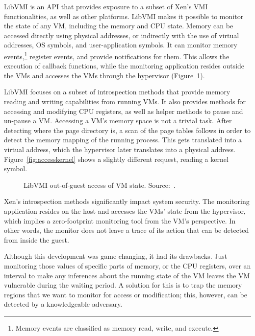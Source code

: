 \par LibVMI is an \ac{API} that provides exposure to a subset of Xen’s \ac{VMI} functionalities, as well as other platforms. LibVMI makes it possible to monitor the state of any \ac{VM}, including the memory and \ac{CPU} state. Memory can be accessed directly using physical addresses, or indirectly with the use of virtual addresses, \ac{OS} symbols, and user-application symbols. It can monitor memory events,\footnote{Memory events are classified as memory read, write, and execute.} register events, and provide notifications for them. This allows the execution of callback functions, while the monitoring application resides outside the \acp{VM} and accesses the \acp{VM} through the hypervisor (Figure~\ref{fig:libvmi}). 

\par LibVMI focuses on a subset of introspection methods that provide memory reading and writing capabilities from running \ac{VM}s. It also provides methods for accessing and modifying \ac{CPU} registers, as well as helper methods to pause and un-pause a \ac{VM}. Accessing a \ac{VM}'s memory space is not a trivial task. After detecting where the page directory is, a scan of the page tables follows in order to detect the memory mapping of the running process. This gets translated into a virtual address, which the hypervisor later translates into a physical address. Figure~\ref{fig:accesskernel} shows a slightly different request, reading a kernel symbol.

\begin{figure}[ht]
	\centering
	
	\caption{LibVMI out-of-guest access of \ac{VM} state. Source:~\cite{libvmi}.}
	\label{fig:libvmi}
\end{figure}

\par Xen’s introspection methods significantly impact system security. The monitoring application resides on the host and accesses the \ac{VM}s' state from the hypervisor, which implies a zero-footprint monitoring tool from the \ac{VM}'s perspective. In other words, the monitor does not leave a trace of its action that can be detected from inside the guest.

\par Although this development was game-changing, it had its drawbacks. Just monitoring those values of specific parts of memory, or the \ac{CPU} registers, over an interval to make any inferences about the running state of the \ac{VM} leaves the \ac{VM} vulnerable during the waiting period. A solution for this is to trap the memory regions that we want to monitor for access or modification; this, however, can be detected by a knowledgeable adversary. 

